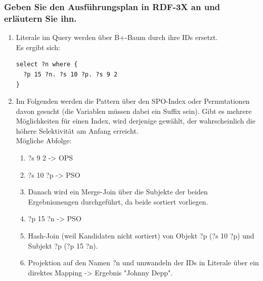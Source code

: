 \documentclass[11pt,a4paper]{scrartcl}
\begin{document}
\subsubsection*{Geben Sie den Ausführungsplan in RDF-3X an und erläutern Sie ihn.}
\begin{enumerate}
\item Literale im Query werden über B+-Baum durch ihre IDs ersetzt.\\
Es ergibt sich:
\begin{verbatim}
select ?n where {
  ?p 15 ?n. ?s 10 ?p. ?s 9 2
}
\end{verbatim}
\item Im Folgenden werden die Pattern über den SPO-Index oder Permutationen davon gesucht (die Variablen müssen dabei ein Suffix sein). Gibt es mehrere Möglichkeiten für einen Index, wird derjenige gewählt, der wahrscheinlich die höhere Selektivität am Anfang erreicht.\\
Mögliche Abfolge:\\
\begin{enumerate}
\item ?s 9 2 -> OPS
\item ?s 10 ?p -> PSO
\item Danach wird ein Merge-Join über die Subjekte der beiden Ergebnismengen durchgeführt, da beide sortiert vorliegen.
\item ?p 15 ?n -> PSO
\item Hash-Join (weil Kandidaten nicht sortiert) von Objekt ?p (?s 10 ?p) und Subjekt ?p (?p 15 ?n).
\item Projektion auf den Namen ?n und umwandeln der IDs in Literale über ein direktes Mapping -> Ergebnis "Johnny Depp".
\end{enumerate}
\end{enumerate}
\end{document}

